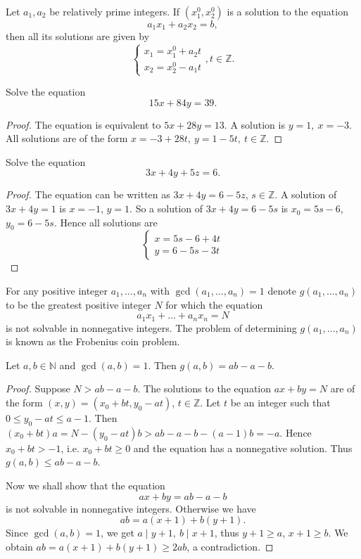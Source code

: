 \begin{cor}
Let $a_1,a_2$ be relatively prime integers. If $(x_1^0,x_2^0)$ is a
solution to the equation
$$a_1x_1+a_2x_2=b, $$
then all its solutions are given by
\begin{equation*}
\begin{cases}
x_1=x_1^0+a_2 t \\
x_2=x_2^0-a_1 t
\end{cases}
,t\in \mathbb{Z}.
\end{equation*}
\end{cor}

\begin{prb}
Solve the equation
$$15x+84y=39. $$
\end{prb}

\begin{proof}
The equation is equivalent to $5x+28y=13$. A solution is $y=1, \
x=-3$. All solutions are of the form $x=-3+28t, \ y=1-5t, \ t\in
\mathbb{Z}$.
\end{proof}

\begin{prb}
Solve the equation
$$3x+4y+5z=6. $$
\end{prb}

\begin{proof}
The equation can be written as $3x+4y=6-5z$, $s\in \mathbb{Z}$. A
solution of $3x+4y=1$ is $x=-1$, $y=1$. So a solution of
$3x+4y=6-5s$ is $x_0=5s-6$, $y_0=6-5s$. Hence all solutions are
\begin{equation*}
\begin{cases}
x=5s-6+4t\\
y=6-5s-3t
\end{cases}
\end{equation*}
\end{proof}

For any positive integer $a_1,\dots,a_n$ with
$\gcd(a_1,\dots,a_n)=1$ denote $g(a_1,\dots,a_n)$ to be the greatest
positive integer $N$ for which the equation
$$a_1x_1+\dots+a_nx_n=N $$
is not solvable in nonnegative integers. The problem of determining
$g(a_1,\dots,a_n)$ is known as the Frobenius coin problem.

\begin{prb}[Sylvester, 1884]
Let $a,b\in \mathbb{N}$ and $\gcd(a,b)=1$. Then $g(a,b)=ab-a-b.$
\end{prb}

\begin{proof}
Suppose $N>ab-a-b$. The solutions to the equation $ax+by=N$ are of
the form $(x,y)=(x_0+bt,y_0-at)$, $t\in \mathbb{Z}$. Let $t$ be an
integer such that $0\leq y_0-at\leq a-1$. Then $(x_0+bt)a=N-
(y_0-at)b > ab-a-b-(a-1)b=-a.$ Hence $x_0+bt>-1$, i.e. $x_0+bt\geq
0$ and the equation has a nonnegative solution. Thus $g(a,b)\leq
ab-a-b$.

Now we shall show that the equation
$$ax+by=ab-a-b $$
is not solvable in nonnegative integers. Otherwise we have
$$ab=a(x+1)+b(y+1). $$
Since $\gcd(a,b)=1$, we get $a\mid y+1, \ b\mid x+1$, thus $y+1\geq
a$, $x+1\geq b$. We obtain $ab=a(x+1)+b(y+1)\geq 2ab$, a
contradiction.
\end{proof}
